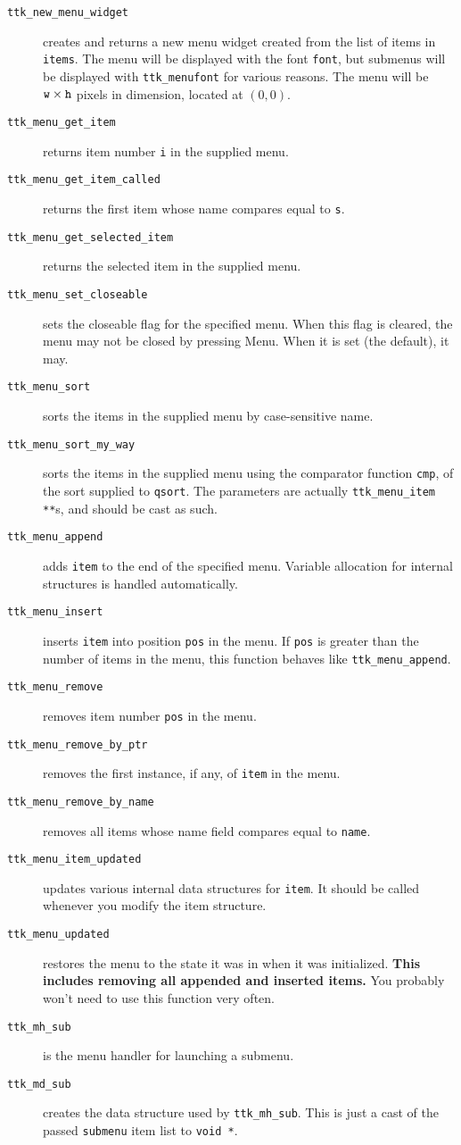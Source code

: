 \documentclass[12pt,letterpaper]{report}
\let\ttt\tt
\def\tt{\def\_{{\ttt\char`\_}}\ttt}
\begin{document}
\begin{description}
\item[{\tt ttk_new_menu_widget}] creates and returns a new menu widget created from the list of items in \verb|items|.
The menu will be displayed with the font \verb|font|, but submenus will be displayed with \verb|ttk_menufont|
for various reasons. The menu will be $\verb|w| \times \verb|h|$ pixels in dimension, located at $(0,0)$.
\item[{\tt ttk_menu_get_item}] returns item number \verb|i| in the supplied menu.
\item[{\tt ttk_menu_get_item_called}] returns the first item whose name compares equal to \verb|s|.
\item[{\tt ttk_menu_get_selected_item}] returns the selected item in the supplied menu.
\item[{\tt ttk_menu_set_closeable}] sets the {\sf closeable} flag for the specified menu. When this flag
is cleared, the menu may not be closed by pressing Menu. When it is set (the default), it may.
\item[{\tt ttk_menu_sort}] sorts the items in the supplied menu by case-sensitive name.
\item[{\tt ttk_menu_sort_my_way}] sorts the items in the supplied menu using the comparator function \verb|cmp|,
of the sort supplied to \verb|qsort|. The parameters are actually \verb|ttk_menu_item **|s, and should be
cast as such.
\item[{\tt ttk_menu_append}] adds \verb|item| to the end of the specified menu. Variable allocation for internal structures
is handled automatically.
\item[{\tt ttk_menu_insert}] inserts \verb|item| into position \verb|pos| in the menu. If \verb|pos| is 
greater than the number of items in the menu, this function behaves like \verb|ttk_menu_append|.
\item[{\tt ttk_menu_remove}] removes item number \verb|pos| in the menu.
\item[{\tt ttk_menu_remove_by_ptr}] removes the first instance, if any, of \verb|item| in the menu.
\item[{\tt ttk_menu_remove_by_name}] removes all items whose name field compares equal to \verb|name|.
\item[{\tt ttk_menu_item_updated}] updates various internal data structures for \verb|item|.
It should be called whenever you modify the item structure.
\item[{\tt ttk_menu_updated}] restores the menu to the state it was in when it was initialized.
{\bf This includes removing all appended and inserted items.} You probably won't need to use this
function very often.
\item[{\tt ttk_mh_sub}] is the menu handler for launching a submenu.
\item[{\tt ttk_md_sub}] creates the data structure used by {\tt ttk_mh_sub}. This is just a cast of
the passed \verb|submenu| item list to \verb|void *|.
\end{description}
\end{document}
